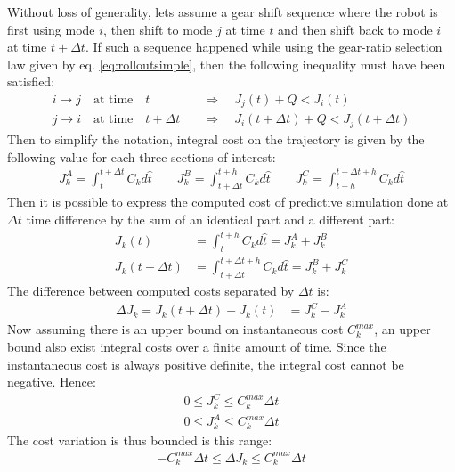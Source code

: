 Without loss of generality, lets assume a gear shift sequence where the robot is first using mode $i$, then shift to mode $j$ at time $t$ and then shift back to mode $i$ at time $t+\Delta t$. If such a sequence happened while using the gear-ratio selection law given by eq. \eqref{eq:rolloutsimple}, then the following inequality must have been satisfied:
%
\begin{align}
i \rightarrow j  \quad\text{at time}\quad t          &\quad\Rightarrow\quad J_j(t) + Q < J_i(t)                  \\
j \rightarrow i  \quad\text{at time}\quad t+\Delta t &\quad\Rightarrow\quad J_i(t+\Delta t) + Q < J_j(t+\Delta t)
\end{align}
%
Then to simplify the notation, integral cost on the trajectory is given by the following value for each three sections of interest:
%
\begin{align}
J_k^A = \int_{t}^{t+\Delta t}{         C_k  d\hat{t}  }   \quad \quad
J_k^B = \int_{t+\Delta t}^{t+h}{       C_k  d\hat{t}  }   \quad \quad
J_k^C = \int_{t+h}^{t+\Delta t+h}{     C_k  d\hat{t}  }
\end{align}
%
Then it is possible to express the computed cost of predictive simulation done at $\Delta t$ time difference by the sum of an identical part and a different part:
%
\begin{align}
J_k(t)          &= \int_{t}^{t+h}{ C_k   d\hat{t} }  = J_k^A + J_k^B \\
J_k(t+\Delta t) &= \int_{t+\Delta t}^{t+\Delta t+h}{   C_k  d\hat{t}} = J_k^B + J_k^C
\end{align}
%
The difference between computed costs separated by $\Delta t$ is:
%
\begin{align}
\Delta J_k = J_k(t+\Delta t) - J_k(t) &= J_k^C - J_k^A
\end{align}
%
Now assuming there is an upper bound on instantaneous cost $C_k^{max}$, an upper bound also exist integral costs over a finite amount of time. Since the instantaneous cost is always positive definite, the integral cost cannot be negative. Hence:
%
\begin{align}
0 \leq J_k^C   \leq  C_k^{max} \Delta t \\
0 \leq J_k^A   \leq  C_k^{max} \Delta t 
\end{align}
%
The cost variation is thus bounded is this range:
%
\begin{align}
-C_k^{max} \Delta t  \leq \Delta J_k \leq C_k^{max} \Delta t
\label{eq:costvariation}
\end{align}
